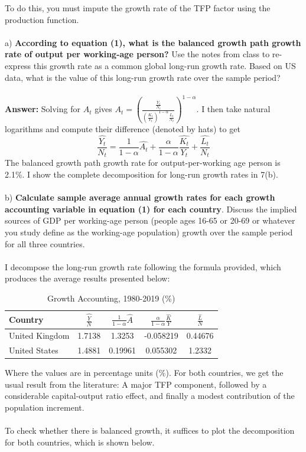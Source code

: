 \documentclass[12pt]{article}
\theoremstyle{mytheoremstyle}
\theoremstyle{mytheoremstyle}
\theoremstyle{myproblemstyle}
\begin{document}
\noindent To do this, you must impute the growth rate of the TFP factor using the production function.
\\ \\ 
a) \textbf{According to equation (1), what is the balanced growth path growth rate of output per working-age person?} Use the notes from class to re-express this growth rate as a common global long-run growth rate. Based on US data, what is the value of this long-run growth rate over the sample period?
\\ \\ 
\textbf{Answer:} Solving for $A_t$ gives $A_t=\left(\frac{\frac{Y_t}{N_t}}{\left(\frac{K_t}{Y_t}\right)^{1-\alpha} \frac{L_t}{N_t}}\right)^{1-\alpha}$. I then take natural logarithms and compute their difference (denoted by hats) to get
$$
\frac{\widehat{Y_t}}{N_t}=\frac{1}{1-\alpha} \widehat{A_t}+\frac{\alpha}{1-\alpha} \frac{\widehat{K_t}}{Y_t}+\frac{\widehat{L_t}}{N_t}
$$
The balanced growth path growth rate for output-per-working age person is 2.1\%. I show the complete decomposition for long-run growth rates in 7(b).
\\ \\ 
b) \textbf{Calculate sample average annual growth rates for each growth accounting variable in equation (1) for each country}. Discuss the implied sources of GDP per working-age person (people ages 16-65 or 20-69 or whatever you study define as the working-age population) growth over the sample period for all three countries.
\\ \\ 
I decompose the long-run growth rate following the formula provided, which produces the average results presented below:

\begin{table}[htbp]
    \centering
    \caption{Growth Accounting, 1980-2019 (\%)}
    \label{tab:growth-accounting}
    \begin{tabular}{lcccc}
    \hline
    Country & $\widehat{\frac{Y}{N}}$ & $\frac{1}{1-\alpha} \widehat{A}$ & $\frac{\alpha}{1-\alpha} \frac{\widehat{K}}{Y}$ & $\frac{\widehat{L}}{N}$ \\ \hline
    United Kingdom & 1.7138 & 1.3253  & -0.058219 & 0.44676 \\
    United States & 1.4881  & 0.19961 & 0.055302 & 1.2332 \\ \hline
    \end{tabular}
    \end{table}

Where the values are in percentage units (\%). For both countries, we get the usual result from the literature: A major TFP component, followed by a considerable capital-output ratio effect, and finally a modest contribution of the population increment. 
\\ \\ 
To check whether there is balanced growth, it suffices to plot the decomposition for both countries, which is shown below.
\end{document}
